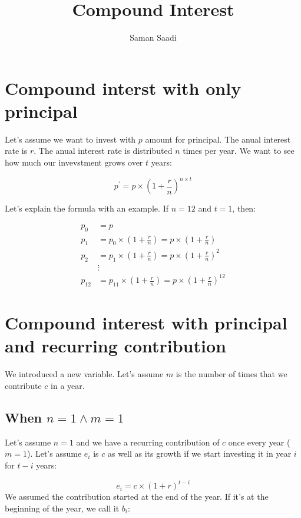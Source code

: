 \documentclass{book}
\title{Compound Interest}
\author{Saman Saadi}
\begin{document}
	\frontmatter
	\maketitle
	\mainmatter
	\section{Compound interst with only principal}
	Let's assume we want to invest with $p$ amount for principal. The anual interest rate is $r$. The anual interest rate is distributed $n$ times per year. We want to see how much our invevstment grows over $t$ years:
	
	\begin{equation*}
		p^{\prime} = p \times (1 + \frac{r}{n})^{n \times t}
	\end{equation*} 
	
	Let's explain the formula with an example. If $n = 12$ and $t=1$, then:
	
	\begin{equation*}
		\begin{split}
			p_0 &= p \\
			p_1 &= p_0 \times (1 + \frac{r}{n}) = p \times (1 + \frac{r}{n}) \\
			p_2 &= p_1 \times (1 + \frac{r}{n}) = p \times (1 + \frac{r}{n})^2 \\
			&\vdots \\
			p_{12} &= p_{11} \times (1 + \frac{r}{n}) = p \times (1 + \frac{r}{n})^{12}
		\end{split}
	\end{equation*}	 
	
	\section{Compound interest with principal and recurring contribution}
	We introduced a new variable. Let's assume $m$ is the number of times that we contribute $c$ in a year.
	\subsection{When $n = 1 \land m = 1$ }
	Let's assume $n=1$ and we have a recurring contribution of $c$ once every year ($m = 1$). Let's assume $e_i$ is $c$ as well as its growth if we start investing it in year $i$ for $t - i$ years:
	
	\begin{equation*}
		e_i = c \times (1 + r)^{t - i}
	\end{equation*}
	We assumed the contribution started at the end of the year. If it's at the beginning of the year, we call it $b_i$:
	
\end{document}
